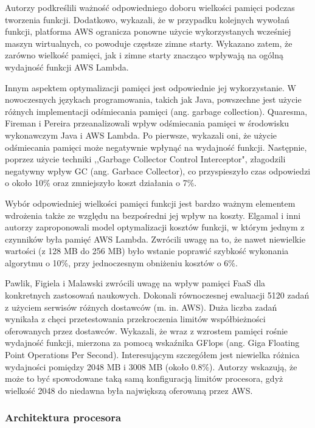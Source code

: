Autorzy podkreślili ważność odpowiedniego doboru wielkości pamięci podczas tworzenia funkcji. 
Dodatkowo, wykazali, że w przypadku kolejnych wywołań funkcji, platforma AWS ogranicza ponowne użycie wykorzystanych wcześniej maszyn wirtualnych, co powoduje częstsze zimne starty.
Wykazano zatem, że zarówno wielkość pamięci, jak i zimne starty znacząco wpływają na ogólną wydajność funkcji AWS Lambda.

Innym aspektem optymalizacji pamięci jest odpowiednie jej wykorzystanie. 
W nowoczesnych językach programowania, takich jak Java, powszechne jest użycie różnych implementacji odśmiecania pamięci (ang. garbage collection). 
Quaresma, Fireman i Pereira \cite{9235063} przeanalizowali wpływ odśmiecania pamięci w środowisku wykonawczym Java i AWS Lambda. 
Po pierwsze, wykazali oni, że użycie odśmiecania pamięci może negatywnie wpłynąć na wydajność funkcji. 
Następnie, poprzez użycie techniki  ,,Garbage Collector Control Interceptor", złagodzili negatywny wpływ GC (ang. Garbace Collector), co przyspieszyło czas odpowiedzi o około 10\% oraz zmniejszyło koszt działania o 7\%. 

Wybór odpowiedniej wielkości pamięci funkcji jest bardzo ważnym elementem wdrożenia także ze względu na bezpośredni jej wpływ na koszty. Elgamal i inni autorzy \cite{8567674} zaproponowali model optymalizacji kosztów funkcji, w którym jednym z czynników była pamięć AWS Lambda. 
Zwrócili uwagę na to, że nawet niewielkie wartości (z 128 MB do 256 MB) było wstanie poprawić szybkość wykonania algorytmu o 10\%, przy jednoczesnym obniżeniu kosztów o 6\%.

Pawlik, Figiela i Malawski \cite{pawlik2019performanceconsiderationsexecutionlarge} zwrócili uwagę na wpływ pamięci FaaS dla konkretnych zastosowań naukowych. 
Dokonali równoczesnej ewaluacji 5120 zadań z użyciem serwisów różnych dostawców (m. in. AWS). 
Duża liczba zadań wynikała z chęci przetestowania przekroczenia limitów współbieżności oferowanych przez dostawców. 
Wykazali, że wraz z wzrostem pamięci rośnie wydajność funkcji, mierzona za pomocą wskaźnika GFlops (ang. Giga Floating Point Operations Per Second). 
Interesującym szczegółem jest niewielka różnica wydajności pomiędzy 2048 MB i 3008 MB (około 0.8\%). 
Autorzy wskazują, że może to być spowodowane taką samą konfiguracją limitów procesora, gdyż wielkość 2048 do niedawna była największą oferowaną przez AWS.

\subsubsection*{Architektura procesora}

